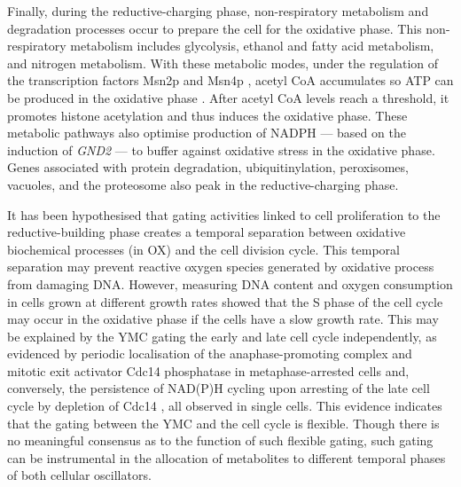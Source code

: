 Finally, during the reductive-charging phase,
non-respiratory metabolism and degradation processes occur to prepare the cell for the oxidative phase.
This non-respiratory metabolism includes glycolysis, ethanol and fatty acid metabolism, and nitrogen metabolism.
With these metabolic modes, under the regulation of the transcription factors Msn2p and Msn4p \citep{kuangMsn2RegulateExpression2017}, acetyl CoA accumulates so ATP can be produced in the oxidative phase \citep{tuLogicYeastMetabolic2005}.
After acetyl CoA levels reach a threshold, it promotes histone acetylation and thus induces the oxidative phase.
These metabolic pathways also optimise production of NADPH --- based on the induction of \emph{GND2} --- to buffer against oxidative stress in the oxidative phase.
Genes associated with protein degradation, ubiquitinylation, peroxisomes, vacuoles, and the proteosome also peak in the reductive-charging phase.

It has been hypothesised that gating activities linked to cell proliferation to the reductive-building phase
creates a temporal separation between oxidative biochemical processes (in OX) and the cell division cycle.
This temporal separation may prevent reactive oxygen species generated by oxidative process from damaging DNA.
However, measuring DNA content and oxygen consumption in cells grown at different growth rates \citep{slavovCouplingGrowthRate2011} showed that the S phase of the cell cycle may occur in the oxidative phase if the cells have a slow growth rate.
This may be explained by the YMC gating the early and late cell cycle independently, as evidenced by periodic localisation of the anaphase-promoting complex and mitotic exit activator Cdc14 phosphatase in metaphase-arrested cells \parencite{luPeriodicCyclinCdkActivity2010} and, conversely, the persistence of NAD(P)H cycling upon arresting of the late cell cycle by depletion of Cdc14 \parencite{papagiannakisAutonomousMetabolicOscillations2017}, all observed in single cells.
This evidence indicates that the gating between the YMC and the cell cycle is flexible.
Though there is no meaningful consensus as to the function of such flexible gating,
such gating can be instrumental in the allocation of metabolites to different temporal phases of both cellular oscillators.


